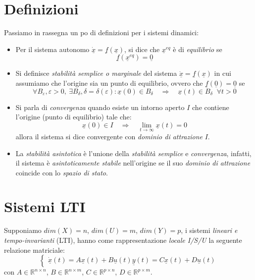 \section{Definizioni}
Passiamo in rassegna un po di definizioni per i sistemi dinamici:
\begin{itemize}
	\item Per il sistema autonomo $\underline{\dot{x}} = \underline{f}(\underline{x})$, si dice che $\underline{x}^{eq}$ è di \emph{equilibrio} se
	\begin{equation}
		\underline{f}(\underline{x}^{eq}) = \underline{0}
	\end{equation}	 
	\item Si definisce \emph{stabilità semplice o marginale} del sistema $\underline{\dot{x}} = \underline{f}(\underline{x})$ in cui assumiamo che l'origine sia un punto di equilibrio, ovvero che $\underline{f}(\underline{0}) = \underline{0}$ se
	\begin{equation}
		\forall B_{\varepsilon}, \varepsilon > 0,\: \exists B_{\delta}, \delta = \delta(\varepsilon) : \underline{x}(0)\in B_{\delta} \quad \Rightarrow \quad \underline{x}(t)\in B_{\delta} \;\; \forall t>0
	\end{equation}
	\item Si parla di \emph{convergenza} quando esiste un intorno aperto $I$ che contiene l'origine (punto di equilibrio) tale che:
	\begin{equation}
		\underline{x}(0)\in I \quad \Rightarrow \quad \lim_{t \to \infty} \underline{x}(t) = 0
	\end{equation}
	allora il sistema si dice convergente con \emph{dominio di attrazione} $I$.
	\item La \emph{stabilità asintotica} è l'unione della \emph{stabilità semplice} e \emph{convergenza}, infatti, il sistema è \emph{asintoticamente stabile} nell'origine se il suo \emph{dominio di attrazione} coincide con lo \emph{spazio di stato}.
\end{itemize}

\section{Sistemi LTI}
Supponiamo $dim(X) = n$, $dim(U) = m$, $dim(Y) = p$, i sistemi \emph{lineari e tempo-invarianti} (LTI), hanno come rappresentazione \emph{locale I/S/U} la seguente relazione matriciale:
\begin{equation}
	\begin{cases}
		\underline{\dot{x}}(t) = A\underline{x}(t) + B\underline{u}(t)
		\underline{y}(t) = C\underline{x}(t) + D\underline{u}(t)
	\end{cases}
\end{equation} 
con $A \in \mathbb{R}^{n \times n}$, $B \in \mathbb{R}^{n \times m}$, $C \in \mathbb{R}^{p \times n}$, $D\in\mathbb{R}^{p \times m}$.
